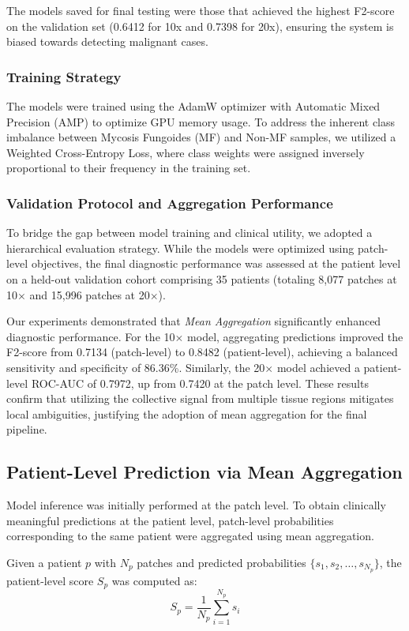 \documentclass[conference]{IEEEtran}
\begin{document}
The models saved for final testing were those that achieved the highest F2-score on the validation set (0.6412 for 10x and 0.7398 for 20x), ensuring the system is biased towards detecting malignant cases.

\subsubsection{Training Strategy}
The models were trained using the AdamW optimizer with Automatic Mixed Precision (AMP) to optimize GPU memory usage. To address the inherent class imbalance between Mycosis Fungoides (MF) and Non-MF samples, we utilized a Weighted Cross-Entropy Loss, where class weights were assigned inversely proportional to their frequency in the training set.

\subsubsection{Validation Protocol and Aggregation Performance}
To bridge the gap between model training and clinical utility, we adopted a hierarchical evaluation strategy. While the models were optimized using patch-level objectives, the final diagnostic performance was assessed at the patient level on a held-out validation cohort comprising 35 patients (totaling 8,077 patches at 10$\times$ and 15,996 patches at 20$\times$).

Our experiments demonstrated that \textit{Mean Aggregation} significantly enhanced diagnostic performance. For the 10$\times$ model, aggregating predictions improved the F2-score from 0.7134 (patch-level) to 0.8482 (patient-level), achieving a balanced sensitivity and specificity of 86.36\%. Similarly, the 20$\times$ model achieved a patient-level ROC-AUC of 0.7972, up from 0.7420 at the patch level. These results confirm that utilizing the collective signal from multiple tissue regions mitigates local ambiguities, justifying the adoption of mean aggregation for the final pipeline.


\subsection{Patient-Level Prediction via Mean Aggregation}
Model inference was initially performed at the patch level. To obtain clinically meaningful predictions at the patient level, patch-level probabilities corresponding to the same patient were aggregated using mean aggregation.

Given a patient $p$ with $N_p$ patches and predicted probabilities $\{s_1, s_2, \ldots, s_{N_p}\}$, the patient-level score $S_p$ was computed as:
\begin{equation}
S_p = \frac{1}{N_p} \sum_{i=1}^{N_p} s_i
\end{equation}
\end{document}

